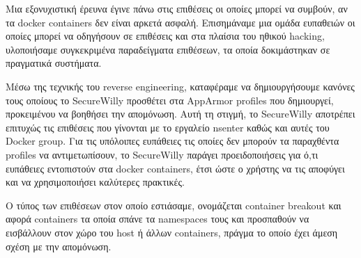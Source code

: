 Μια εξονυχιστική έρευνα έγινε πάνω στις επιθέσεις οι οποίες μπορεί να συμβούν, αν τα \en docker containers\gr{} δεν είναι αρκετά ασφαλή. Επισημάναμε μια ομάδα ευπαθειών οι οποίες μπορεί να οδηγήσουν σε επιθέσεις και στα πλαίσια του ηθικού \en hacking\gr{}, υλοποιήσαμε συγκεκριμένα παραδείγματα επιθέσεων, τα οποία δοκιμάστηκαν σε πραγματικά συστήματα.

Μέσω της τεχνικής του \en reverse engineering\gr{}, καταφέραμε να δημιουργήσουμε κανόνες τους οποίους το \en SecureWilly\gr{} προσθέτει στα \en AppArmor profiles\gr{} που δημιουργεί, προκειμένου να βοηθήσει την απομόνωση. Αυτή τη στιγμή, το \en SecureWilly\gr{} αποτρέπει επιτυχώς τις επιθέσεις που γίνονται με το εργαλείο \en nsenter\gr{} καθώς και αυτές του \en Docker group\gr{}. Για τις υπόλοιπες ευπάθειες τις οποίες δεν μπορούν τα παραχθέντα \en profiles\gr{} να αντιμετωπίσουν, το \en SecureWilly\gr{} παράγει προειδοποιήσεις για ό,τι ευπάθειες εντοπιστούν στα \en docker containers\gr{}, έτσι ώστε ο χρήστης να τις αποφύγει και να χρησιμοποιήσει καλύτερες πρακτικές.

Ο τύπος των επιθέσεων στον οποίο εστιάσαμε, ονομάζεται \en container breakout\gr{} και αφορά \en containers\gr{} τα οποία σπάνε τα \en namespaces\gr{} τους και προσπαθούν να εισβάλλουν στον χώρο του \en host\gr{} ή άλλων \en containers\gr{}, πράγμα το οποίο έχει άμεση σχέση με την απομόνωση.

